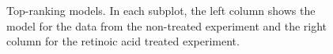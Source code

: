 \documentclass{article}
\begin{document}
\begin{figure}[htb]
  \caption{Top-ranking models. In each subplot, the left column shows
    the model for the data from the non-treated experiment and the
    right column for the retinoic acid treated experiment.}
  \label{fig:model1}
\end{figure}
\end{document}
